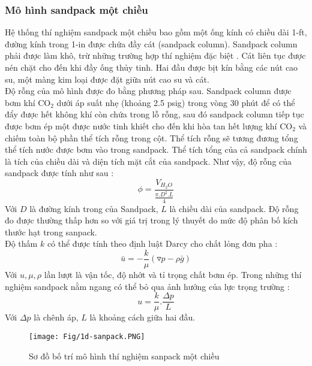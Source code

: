 \documentclass[12pt,a4paper]{article}
\begin{document}
	\subsubsection{Mô hình sandpack một chiều}
	Hệ thống thí nghiệm sandpack một chiều bao gồm một ống kính có chiều dài 1-ft, đường kính trong 1-in được chứa đầy cát (sandpack column). Sandpack column phải được làm khô, trừ những trường hợp thí nghiệm đặc biệt \cite{li2011study}. Cát liên tục được nén chặt cho đến khi đầy ống thủy tinh. Hai đầu được bịt kín bằng các nút cao su, một màng kim loại được đặt giữa nút cao su và cát.\\
	Độ rỗng của mô hình được đo bằng phương pháp sau. Sandpack column được bơm khí CO$_2$ dưới áp suất nhẹ (khoảng 2.5 psig) trong vòng 30 phút để có thể đẩy được hết không khí còn chứa trong lỗ rỗng, sau đó sandpack column tiếp tục được bơm ép một được nước tinh khiết cho đến khi hòa tan hết lượng khí CO$_2$ và chiếm toàn bộ phần thể tích rỗng trong cột. Thể tích rỗng sẽ tương đương tổng thể tích nước được bơm vào trong sandpack. Thể tích tổng của cả sandpack chính là tích của chiều dài và diện tích mặt cắt của sandpack. Như vậy, độ rỗng của sandpack được tính như sau \cite{li2011study}:
		\begin{equation}
			\phi=\frac{V_{H_2O}}{\frac{\pi.D
			^2.L}{4}}
		\end{equation}
	Với $D$ là đường kính trong của Sandpack, $L$ là chiều dài của sandpack. Độ rỗng đo được thường thấp hơn so với giá trị trong lý thuyết do mức độ phân bố kích thước hạt trong sanpack.\\Độ thấm $k$ có thể được tính theo định luật Darcy cho chất lỏng đơn pha \cite{li2011study}:
		\begin{equation}
			\bar u =-\frac{k}{\mu}(\triangledown p-\rho \bar g)
		\end{equation}
	Với $u, \mu, \rho$ lần lượt là vận tốc, độ nhớt và tỉ trọng chất bơm ép. Trong những thí nghiệm sandpack nằm ngang có thể bỏ qua ảnh hưởng của lực trọng trường \cite{li2011study}:
		\begin{equation}
			u=\frac{k}{\mu}.\frac{\Delta p}{L}
		\end{equation}
	Với $\Delta p$ là chênh áp, $L$ là khoảng cách giữa hai đầu.
		\begin{figure}[h]
			\centering
			\texttt{[image: Fig/1d-sanpack.PNG]}
			\caption{Sơ đồ bố trí mô hình thí nghiệm sanpack một chiều \cite{li2011study}}
		\end{figure}
	\newpage
\end{document}
